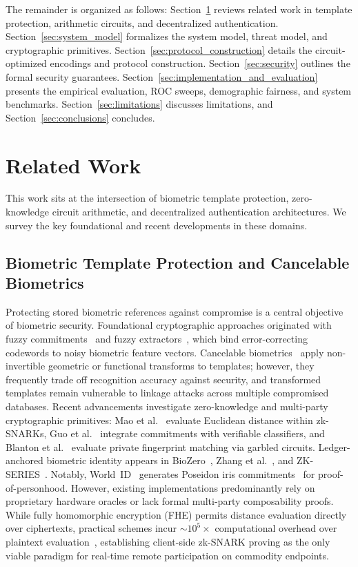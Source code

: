 \documentclass[10pt,letterpaper,journal]{IEEEtran}
\begin{document}
The remainder is organized as follows: Section~\ref{sec:related} reviews related work in template protection, arithmetic circuits, and decentralized authentication. Section~\ref{sec:system_model} formalizes the system model, threat model, and cryptographic primitives. Section~\ref{sec:protocol_construction} details the circuit-optimized encodings and protocol construction. Section~\ref{sec:security} outlines the formal security guarantees. Section~\ref{sec:implementation_and_evaluation} presents the empirical evaluation, ROC sweeps, demographic fairness, and system benchmarks. Section~\ref{sec:limitations} discusses limitations, and Section~\ref{sec:conclusions} concludes.

\section{Related Work}
\label{sec:related}

This work sits at the intersection of biometric template protection, zero-knowledge circuit arithmetic, and decentralized authentication architectures. We survey the key foundational and recent developments in these domains.

\subsection{Biometric Template Protection and Cancelable Biometrics}
\label{subsec:rel_biometric}
Protecting stored biometric references against compromise is a central objective of biometric security. Foundational cryptographic approaches originated with fuzzy commitments~\cite{JuelsWattenberg1999} and fuzzy extractors~\cite{Dodis2004}, which bind error-correcting codewords to noisy biometric feature vectors. Cancelable biometrics~\cite{Rathgeb2011} apply non-invertible geometric or functional transforms to templates; however, they frequently trade off recognition accuracy against security, and transformed templates remain vulnerable to linkage attacks across multiple compromised databases. 
Recent advancements investigate zero-knowledge and multi-party cryptographic primitives: Mao et al.~\cite{Mao2023} evaluate Euclidean distance within zk-SNARKs, Guo et al.~\cite{Guo2024} integrate commitments with verifiable classifiers, and Blanton et al.~\cite{Blanton2024} evaluate private fingerprint matching via garbled circuits. Ledger-anchored biometric identity appears in BioZero~\cite{Lai2024}, Zhang et al.~\cite{Zhang2025}, and ZK-SERIES~\cite{ZKSeries2025}. Notably, World~ID~\cite{WorldID2024} generates Poseidon iris commitments~\cite{Grassi2021} for proof-of-personhood. However, existing implementations predominantly rely on proprietary hardware oracles or lack formal multi-party composability proofs. While fully homomorphic encryption (FHE) permits distance evaluation directly over ciphertexts, practical schemes incur $\sim 10^5\times$ computational overhead over plaintext evaluation~\cite{Chialva2024,Karakosta2025,Moustaka2024}, establishing client-side zk-SNARK proving as the only viable paradigm for real-time remote participation on commodity endpoints.
\end{document}
